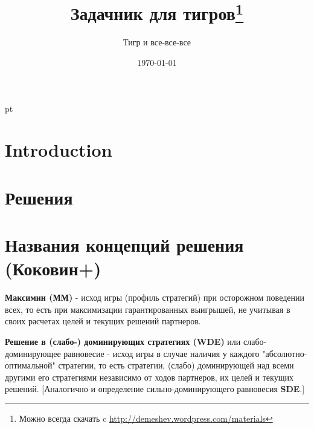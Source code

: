 \documentclass[pdftex,12pt,a4paper]{article}
\title{Задачник для тигров\footnote{Можно всегда скачать c \url{http://demeshev.wordpress.com/materials}}}
\author{Тигр и все-все-все}
\date{\today}
\begin{document}
\pagestyle{myheadings} 

\nocite{winkler:gpdp} \nocite{colell:mt} \nocite{binmore:fg}
\nocite{ilf:12} \nocite{kino:mind} \nocite{jowas:incorrect} \nocite{redondo:etg} \nocite{sekei:paradox}
\nocite{polisci:lectures} \nocite{cramton:lectures} \nocite{mti:lectures} \nocite{kockesen:lectures} \nocite{brams:dps} \nocite{squintani:nncgt} \nocite{zade:rn} \nocite{osborne:igt} \nocite{osborne:cgt} \nocite{miller:gtw} \nocite{gintis:gte} \nocite{danilov:lte} \nocite{gt.net}

\maketitle
\tableofcontents{}

 pt %

\section{Introduction} 


\problemonly


\restoresection
\section{Решения}
\solutiononly
\addtocounter{secsolution}{1} %



\restoresection

\section{Названия концепций решения (Коковин+)}
\textbf{Максимин (ММ)} - исход игры (профиль
стратегий) при осторожном поведении всех, то есть
при максимизации гарантированных выигрышей, не
учитывая в своих расчетах целей и текущих решений
партнеров.\vspace{2mm}

\textbf{Решение в (слабо-) доминирующих стратегиях
(WDE)} или слабо-доминирующее равновесие - исход
игры в случае наличия у каждого
"абсолютно-оптимальной" стратегии, то есть
стратегии, (слабо) доминирующей над всеми другими
его стратегиями независимо от ходов партнеров, их
целей и текущих решений. [Аналогично и определение
сильно-доминирующего равновесия
\textbf{SDE}.]\vspace{2mm}
\end{document}
